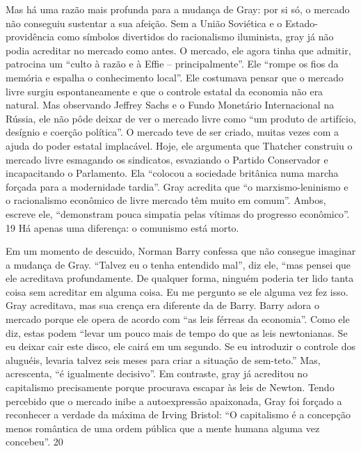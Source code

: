 \par
 
Mas há uma razão mais profunda para a mudança de Gray: por si só, o mercado não conseguiu sustentar a sua afeição. Sem a União Soviética e o Estado-providência como símbolos divertidos do racionalismo iluminista, gray já não podia acreditar no mercado como antes. O mercado, ele agora tinha que admitir, patrocina um “culto à razão e à Effie – principalmente”. Ele “rompe os fios da memória e espalha o conhecimento local”. Ele costumava pensar que o mercado livre surgiu espontaneamente e que o controle estatal da economia não era natural. Mas observando Jeffrey Sachs e o Fundo Monetário Internacional na Rússia, ele não pôde deixar de ver o mercado livre como “um produto de artifício, desígnio e coerção política”. O mercado teve de ser criado, muitas vezes com a ajuda do poder estatal implacável. Hoje, ele argumenta que Thatcher construiu o mercado livre esmagando os sindicatos, esvaziando o Partido Conservador e incapacitando o Parlamento. Ela “colocou a sociedade britânica numa marcha forçada para a modernidade tardia”. Gray acredita que “o marxismo-leninismo e o racionalismo econômico de livre mercado têm muito em comum”. Ambos, escreve ele, “demonstram pouca simpatia pelas vítimas do progresso econômico”.
 {\color{blue} 19}  
Há apenas uma diferença: o comunismo está morto.
 
\par
 
Em um momento de descuido, Norman Barry confessa que não consegue imaginar a mudança de Gray. “Talvez eu o tenha entendido mal”, diz ele, “mas pensei que ele acreditava profundamente. De qualquer forma, ninguém poderia ter lido tanta coisa sem acreditar em alguma coisa. Eu me pergunto se ele alguma vez fez isso. Gray acreditava, mas sua crença era diferente da de Barry. Barry adora o mercado porque ele opera de acordo com “as leis férreas da economia”. Como ele diz, estas podem “levar um pouco mais de tempo do que as leis newtonianas. Se eu deixar cair este disco, ele cairá em um segundo. Se eu introduzir o controle dos aluguéis, levaria talvez seis meses para criar a situação de sem-teto.” Mas, acrescenta, “é igualmente decisivo”. Em contraste, gray já acreditou no capitalismo precisamente porque procurava escapar às leis de Newton. Tendo percebido que o mercado inibe a autoexpressão apaixonada, Gray foi forçado a reconhecer a verdade da máxima de Irving Bristol: “O capitalismo é a concepção menos romântica de uma ordem pública que a mente humana alguma vez concebeu”.
 {\color{blue} 20}  

